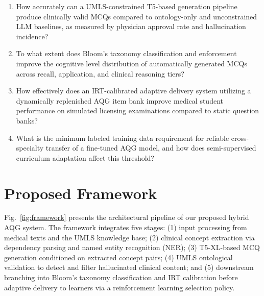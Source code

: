 \documentclass[conference]{IEEEtran}
\begin{document}
\begin{enumerate}[label=\textbf{RQ\arabic*.}]
    \item How accurately can a UMLS-constrained T5-based generation pipeline produce clinically valid MCQs compared to ontology-only and unconstrained LLM baselines, as measured by physician approval rate and hallucination incidence?
    \item To what extent does Bloom's taxonomy classification and enforcement improve the cognitive level distribution of automatically generated MCQs across recall, application, and clinical reasoning tiers?
    \item How effectively does an IRT-calibrated adaptive delivery system utilizing a dynamically replenished AQG item bank improve medical student performance on simulated licensing examinations compared to static question banks?
    \item What is the minimum labeled training data requirement for reliable cross-specialty transfer of a fine-tuned AQG model, and how does semi-supervised curriculum adaptation affect this threshold?
\end{enumerate}

\section{Proposed Framework}

Fig.~\ref{fig:framework} presents the architectural pipeline of our proposed hybrid AQG system. The framework integrates five stages: (1) input processing from medical texts and the UMLS knowledge base; (2) clinical concept extraction via dependency parsing and named entity recognition (NER); (3) T5-XL-based MCQ generation conditioned on extracted concept pairs; (4) UMLS ontological validation to detect and filter hallucinated clinical content; and (5) downstream branching into Bloom's taxonomy classification and IRT calibration before adaptive delivery to learners via a reinforcement learning selection policy.
\end{document}
